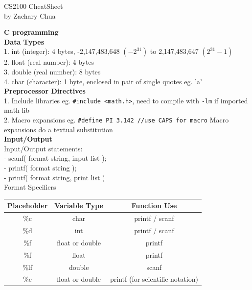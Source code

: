 \documentclass[10pt, a4paper]{article}
\author{Zachary Chua Yan Ern}
\date{16 September 2020}
\begin{document}
	\scriptsize %
	\setlength\parindent{0pt}
	\setlength{\columnseprule}{0.1pt}
	
	\begin{center}
		{\large CS2100 CheatSheet}\\
		by Zachary Chua
	\end{center}
	
	\begin{multicols*}{3}
		
		{\normalsize\textbf{C programming}}\\
		
		\textbf{Data Types}\\
		1. int (integer): 4 bytes, -2,147,483,648 $(-2^{31})$ to 2,147,483,647 $(2^{31} - 1)$\\
		2. float (real number): 4 bytes\\
		3. double (real number): 8 bytes\\
		4. char (character): 1 byte, enclosed in pair of single quotes eg. 'a'\\
		
		\textbf{Preprocessor Directives}\\
		1. Include libraries eg. \texttt{\#include <math.h>}, need to compile with \texttt{-lm} if imported math lib\\
		2. Macro expansions eg. \texttt{\#define PI 3.142 //use CAPS for macro}
		Macro expansions do a textual substitution\\
		
		\textbf{Input/Output}\\
		Input/Output statements:\\
		- scanf( format string, input list );\\
		- printf( format string );\\
		- printf( format string, print list )\\
		Format Specifiers\\
		
		\begin{tabular}{ | c | c | c |}
			\hline
			Placeholder & Variable Type & Function Use \\
			\hline
			\%c & char & printf / scanf\\
			\hline
			\%d & int & printf / scanf\\
			\hline
			\%f & float or double & printf \\
			\hline
			\%f & float & printf \\
			\hline
			\%lf & double & scanf \\
			\hline
			\%e & float or double & printf (for scientific notation)\\
			\hline
		\end{tabular}\\
	

\end{multicols*}
\end{document}
